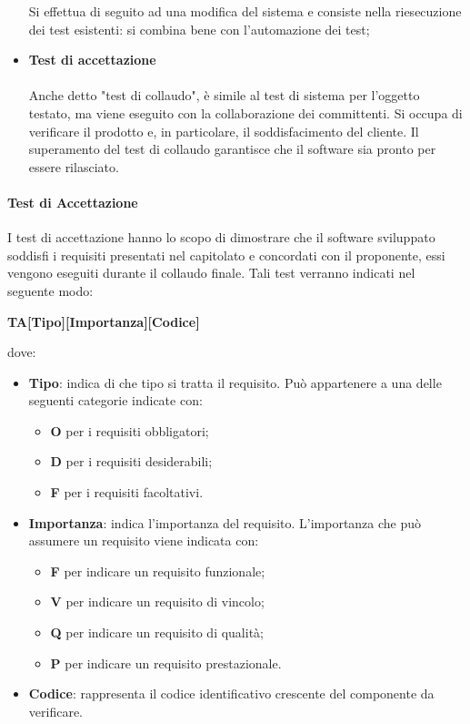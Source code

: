 \begin{itemize}
			Si effettua di seguito ad una modifica del sistema e consiste nella riesecuzione dei test esistenti: si combina bene con l'automazione dei test; \newline \newline
			\item \textbf{Test di accettazione} \mbox{}\\ \mbox{}\\
			Anche detto "test di collaudo", è simile al test di sistema per l'oggetto testato, ma viene eseguito con la collaborazione dei committenti. Si occupa di verificare il prodotto e, in particolare, il soddisfacimento del cliente. Il superamento del test di collaudo garantisce che il software sia pronto per essere rilasciato.
			\end{itemize}
			\paragraph{Test di Accettazione}
				I test di accettazione hanno lo scopo di dimostrare che il software sviluppato 
				soddisfi i requisiti presentati nel capitolato e concordati con il proponente, essi vengono eseguiti durante il
				collaudo finale. Tali test verranno indicati nel seguente modo: \\ 
				\centerline{\textbf{TA[Tipo][Importanza][Codice]}}
				dove:
				\begin{itemize}
					\item \textbf{Tipo}: indica di che tipo si tratta il requisito. Può
						appartenere a una delle seguenti categorie indicate con:
					\begin{itemize}
						\item \textbf{O} per i requisiti obbligatori;
						\item \textbf{D} per i requisiti desiderabili;
						\item \textbf{F} per i requisiti facoltativi.			
					\end{itemize}
					\item \textbf{Importanza}: indica l'importanza del requisito. L'importanza
					che può assumere un requisito viene indicata con:
					\begin{itemize}
						\item \textbf{F} per indicare un requisito funzionale;
						\item \textbf{V} per indicare un requisito di vincolo;
						\item \textbf{Q} per indicare un requisito di qualità;
						\item \textbf{P} per indicare un requisito prestazionale. 
					\end{itemize}
					\item \textbf{Codice}: rappresenta il codice identificativo crescente
					del componente da verificare.
				\end{itemize}
				
